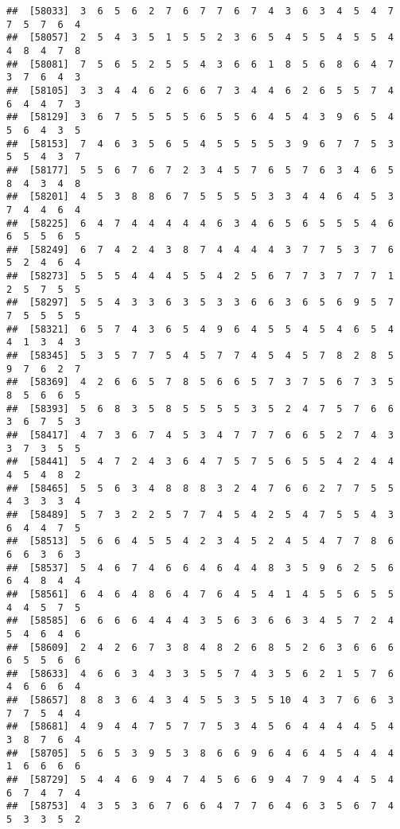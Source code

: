 \documentclass[
]{book}
\begin{document}
\begin{verbatim}
##  [58033]  3  6  5  6  2  7  6  7  7  6  7  4  3  6  3  4  5  4  7  7  5  7  6  4
##  [58057]  2  5  4  3  5  1  5  5  2  3  6  5  4  5  5  4  5  5  4  4  8  4  7  8
##  [58081]  7  5  6  5  2  5  5  4  3  6  6  1  8  5  6  8  6  4  7  3  7  6  4  3
##  [58105]  3  3  4  4  6  2  6  6  7  3  4  4  6  2  6  5  5  7  4  6  4  4  7  3
##  [58129]  3  6  7  5  5  5  5  6  5  5  6  4  5  4  3  9  6  5  4  5  6  4  3  5
##  [58153]  7  4  6  3  5  6  5  4  5  5  5  5  3  9  6  7  7  5  3  5  5  4  3  7
##  [58177]  5  5  6  7  6  7  2  3  4  5  7  6  5  7  6  3  4  6  5  8  4  3  4  8
##  [58201]  4  5  3  8  8  6  7  5  5  5  5  3  3  4  4  6  4  5  3  7  4  4  6  4
##  [58225]  6  4  7  4  4  4  4  4  6  3  4  6  5  6  5  5  5  4  6  6  5  5  6  5
##  [58249]  6  7  4  2  4  3  8  7  4  4  4  4  3  7  7  5  3  7  6  5  2  4  6  4
##  [58273]  5  5  5  4  4  4  5  5  4  2  5  6  7  7  3  7  7  7  1  2  5  7  5  5
##  [58297]  5  5  4  3  3  6  3  5  3  3  6  6  3  6  5  6  9  5  7  7  5  5  5  5
##  [58321]  6  5  7  4  3  6  5  4  9  6  4  5  5  4  5  4  6  5  4  4  1  3  4  3
##  [58345]  5  3  5  7  7  5  4  5  7  7  4  5  4  5  7  8  2  8  5  9  7  6  2  7
##  [58369]  4  2  6  6  5  7  8  5  6  6  5  7  3  7  5  6  7  3  5  8  5  6  6  5
##  [58393]  5  6  8  3  5  8  5  5  5  5  3  5  2  4  7  5  7  6  6  3  6  7  5  3
##  [58417]  4  7  3  6  7  4  5  3  4  7  7  7  6  6  5  2  7  4  3  3  7  3  5  5
##  [58441]  5  4  7  2  4  3  6  4  7  5  7  5  6  5  5  4  2  4  4  4  5  4  8  2
##  [58465]  5  5  6  3  4  8  8  8  3  2  4  7  6  6  2  7  7  5  5  4  3  3  3  4
##  [58489]  5  7  3  2  2  5  7  7  4  5  4  2  5  4  7  5  5  4  3  6  4  4  7  5
##  [58513]  5  6  6  4  5  5  4  2  3  4  5  2  4  5  4  7  7  8  6  6  6  3  6  3
##  [58537]  5  4  6  7  4  6  6  4  6  4  4  8  3  5  9  6  2  5  6  6  4  8  4  4
##  [58561]  6  4  6  4  8  6  4  7  6  4  5  4  1  4  5  5  6  5  5  4  4  5  7  5
##  [58585]  6  6  6  6  4  4  4  3  5  6  3  6  6  3  4  5  7  2  4  5  4  6  4  6
##  [58609]  2  4  2  6  7  3  8  4  8  2  6  8  5  2  6  3  6  6  6  6  5  5  6  6
##  [58633]  4  6  6  3  4  3  3  5  5  7  4  3  5  6  2  1  5  7  6  4  6  6  6  4
##  [58657]  8  8  3  6  4  3  4  5  5  3  5  5 10  4  3  7  6  6  3  7  7  5  4  4
##  [58681]  4  9  4  4  7  5  7  7  5  3  4  5  6  4  4  4  4  5  4  3  8  7  6  4
##  [58705]  5  6  5  3  9  5  3  8  6  6  9  6  4  6  4  5  4  4  4  1  6  6  6  6
##  [58729]  5  4  4  6  9  4  7  4  5  6  6  9  4  7  9  4  4  5  4  6  7  4  7  4
##  [58753]  4  3  5  3  6  7  6  6  4  7  7  6  4  6  3  5  6  7  4  5  3  3  5  2

\end{verbatim}
\end{document}
